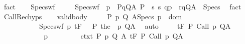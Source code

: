 \begin{isabellebody}
\ fact\isanewline
\ \ \isamarkupfalse%
\ Specs{\isacharunderscore}wf{\isacharcolon}\ \isanewline
\ \ \ \ {\isachardoublequoteopen}Specs{\isacharunderscore}wf\ {\isacharequal}\ {\isacharparenleft}{\isasymlambda}p\ {\isasymtau}{\isachardot}\ {\isacharparenleft}{\isasymlambda}{\isacharparenleft}P{\isacharcomma}q{\isacharcomma}Q{\isacharcomma}A{\isacharparenright}{\isachardot}\ {\isacharparenleft}P\ {\isasyminter}\ {\isacharbraceleft}s{\isachardot}\ {\isacharparenleft}{\isacharparenleft}s{\isacharcomma}\ q{\isacharparenright}{\isacharcomma}{\isasymtau}{\isacharcomma}p{\isacharparenright}\ {\isasymin}\ r{\isacharbraceright}{\isacharcomma}q{\isacharcomma}Q{\isacharcomma}A{\isacharparenright}{\isacharparenright}\ {\isacharbackquote}\ Specs{\isacharparenright}{\isachardoublequoteclose}\ \isamarkupfalse%
\ fact\isanewline
\ \ \isamarkupfalse%
\ CallRec{\isachardot}hyps\isanewline
\ \ \isamarkupfalse%
\ valid{\isacharunderscore}body{\isacharcolon}\ \isanewline
\ \ \ \ {\isachardoublequoteopen}{\isasymforall}{\isacharparenleft}P{\isacharcomma}\ p{\isacharcomma}\ Q{\isacharcomma}\ A{\isacharparenright}{\isasymin}Specs{\isachardot}\ p\ {\isasymin}\ dom\ {\isasymGamma}\ {\isasymand}\isanewline
\ \ \ \ \ \ \ \ {\isacharparenleft}{\isasymforall}{\isasymtau}{\isachardot}\ {\isasymGamma}{\isacharcomma}{\isasymTheta}\ {\isasymunion}\ Specs{\isacharunderscore}wf\ p\ {\isasymtau}{\isasymTurnstile}\isactrlsub t\isactrlbsub {\isacharslash}F\isactrlesub \ {\isacharparenleft}{\isacharbraceleft}{\isasymtau}{\isacharbraceright}\ {\isasyminter}\ P{\isacharparenright}\ the\ {\isacharparenleft}{\isasymGamma}\ p{\isacharparenright}\ Q{\isacharcomma}A{\isacharparenright}{\isachardoublequoteclose}\ \isamarkupfalse%
\ auto\isanewline
\ \ \isamarkupfalse%
\ {\isachardoublequoteopen}{\isasymGamma}{\isacharcomma}{\isasymTheta}\ {\isasymTurnstile}\isactrlsub t\isactrlbsub {\isacharslash}F\isactrlesub \ P\ {\isacharparenleft}Call\ p{\isacharparenright}\ Q{\isacharcomma}A{\isachardoublequoteclose}\isanewline
\ \ \isamarkupfalse%
\ {\isacharminus}\isanewline
\ \ \ \ \isacommand{{\isacharbraceleft}}\isamarkupfalse%
\isanewline
\ \ \ \ \ \ \isamarkupfalse%
\ {\isasymtau}p\ \isanewline
\ \ \ \ \ \ \isamarkupfalse%
\ ctxt{\isacharcolon}\ {\isachardoublequoteopen}{\isasymforall}{\isacharparenleft}P{\isacharcomma}\ p{\isacharcomma}\ Q{\isacharcomma}\ A{\isacharparenright}{\isasymin}{\isasymTheta}{\isachardot}\ {\isasymGamma}{\isasymTurnstile}\isactrlsub t\isactrlbsub {\isacharslash}F\isactrlesub \ P\ {\isacharparenleft}Call\ p{\isacharparenright}\ Q{\isacharcomma}A{\isachardoublequoteclose}\ \isanewline

\end{isabellebody}
